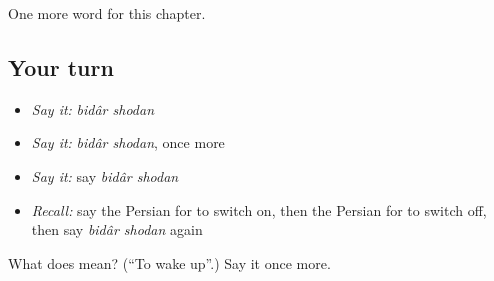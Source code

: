 \begin{grammarlens}[title={What you've built}]
One more word for this chapter.
\end{grammarlens}

\subsection*{Your turn}
\begin{itemize}
\raggedright
  \item \emph{Say it:} \emph{bidâr shodan}
  \item \emph{Say it:} \emph{bidâr shodan}, once more
  \item \emph{Say it:} say \emph{bidâr shodan}
  \item \emph{Recall:} say the Persian for to switch on, then the Persian for to switch off, then say \emph{bidâr shodan} again
\end{itemize}

\begin{tcolorbox}[breakable,colback=teal!4,colframe=teal!35!black,title={Before you move on}]
What does   mean? (\textquotedblleft{}To wake up\textquotedblright{}.) Say it once more.
\end{tcolorbox}
